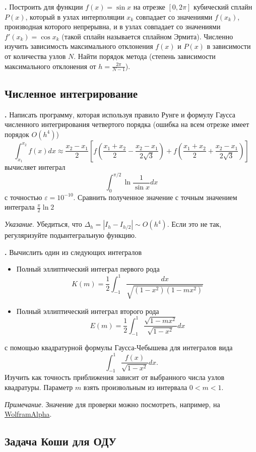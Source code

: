 \documentclass[12pt]{article}
\newcounter{task}
\newcommand{\problem}{\par\textbf{\stepcounter{task}\thetask. }}
\begin{document}
\problem Построить для функции $f(x) = \sin x$ на отрезке $[0, 2\pi]$ кубический
сплайн $P(x)$, который в узлах интерполяции $x_k$ совпадает со значениями $f(x_k)$,
производная которого непрерывна, и в узлах совпадает со значениями $f'(x_k) =
\cos x_k$ (такой сплайн называется сплайном Эрмита). Численно изучить зависимость
максимального отклонения $f(x)$ и $P(x)$ в зависимости от количества узлов $N$.
Найти порядок метода (степень зависимости максимального отклонения от
$h = \frac{2\pi}{N - 1}$).

\subsection{Численное интегрирование}

\problem Написать программу, которая используя правило Рунге и формулу
Гаусса численного интегрирования четвертого порядка (ошибка на всем
отрезке имеет порядок $O(h^4)$)
\[
\int_{x_1}^{x_2} f(x) dx \approx \frac{x_2 - x_1}{2}\left[
f\left(\frac{x_1+x_2}{2} - \frac{x_2 - x_1}{2\sqrt{3}}\right) +
f\left(\frac{x_1+x_2}{2} + \frac{x_2 - x_1}{2\sqrt{3}}\right)
\right]
\]
вычисляет интеграл
\[
\int_0^{\pi/2} \ln \frac{1}{\sin x} dx
\]
с точностью $\varepsilon = 10^{-10}$. Сравнить полученное значение с точным
значением интеграла $\frac{\pi}{2} \ln 2$

\emph{Указание}. Убедиться, что $\Delta_h = |I_h - I_{h/2}| \sim O(h^4)$. Если это
не так, регуляризуйте подынтегральную функцию.

\problem Вычислить один из следующих интегралов
\begin{itemize}
\item Полный эллиптический интеграл первого рода
\[
K(m) = \frac{1}{2}\int_{-1}^1 \frac{dx}{\sqrt{(1-x^2)(1 - m x^2)}}
\]
\item Полный эллиптический интеграл второго рода
\[
E(m) = \frac{1}{2}\int_{-1}^1 \frac{\sqrt{1 - m x^2}}{\sqrt{1-x^2}}dx
\]
\end{itemize}
с помощью квадратурной формулы Гаусса-Чебышева для интегралов вида
\[
\int_{-1}^1 \frac{f(x)}{\sqrt{1-x^2}} dx.
\]
Изучить как точность приближения зависит от выбранного числа узлов квадратуры.
Параметр $m$ взять произвольным из интервала $0 < m < 1$. 

\emph{Примечание}. Значение для проверки можно посмотреть, например, на \href{http://www.wolframalpha.com/input/?i=K(1\%2F2)}{WolframAlpha}.

\subsection{Задача Коши для ОДУ}
\end{document}
